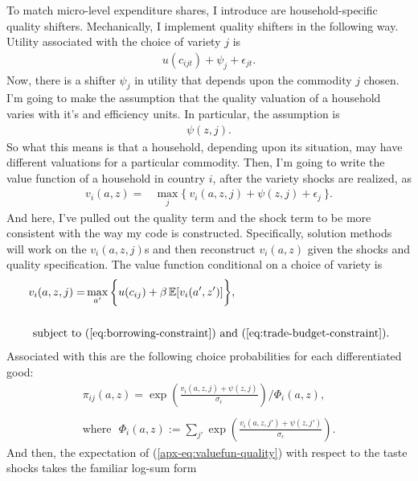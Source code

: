 \documentclass[12pt,pdftex]{article}
\begin{document}
\begin{onehalfspacing}
To match micro-level expenditure shares, I introduce are household-specific quality shifters. Mechanically, I implement quality shifters in the following way. Utility associated with the choice of variety $j$ is
\begin{align}
u(c_{ijt}) + \psi_{j} + \epsilon_{jt}.\label{apx-eq:utility-quality}
\end{align}
Now, there is a shifter $\psi_{j}$ in utility that depends upon the commodity $j$ chosen. I'm going to make the assumption that the quality valuation of a household varies with it's and efficiency units. In particular, the assumption is
\begin{align}
\psi(z, j).
\end{align}
So what this means is that a household, depending upon its situation, may have different valuations for a particular commodity. Then, I'm going to write the value function of a household in country $i$, after the variety shocks are realized, as
\begin{align}
v_{i}(a, z) = &  \max_{j} \big  \{ \  v_{i}(a, z, j) + \psi(z, j) + \epsilon_{j} \ \big \}. \label{apx-eq:valuefun-quality}
\end{align}
And here, I've pulled out the quality term and the shock term to be more consistent with the way my code is constructed. Specifically, solution methods will work on the $v_{i}(a, z, j)$s and then reconstruct $v_{i}(a, z)$ given the shocks and quality specification. The value function conditional on a choice of variety is
\begin{align}
v_{i}(a, z, j) = &  \max_{\ a' \ }\bigg  \{ u(c_{ij}) + \beta \, \mathbb{E} [v_{i}(a', z')]  \bigg\},\\
\nonumber \\
\mbox{subject to}  \ & (\ref{eq:borrowing-constraint}) \  \mathrm{and} \ (\ref{eq:trade-budget-constraint}). \nonumber
\end{align}
Associated with this are the following choice probabilities for each differentiated good:
\begin{align}
\pi_{ij}(a, z) = \exp \left( \frac{ v_{i}(a, z, j) + \psi(z, j) }{\sigma_{\epsilon}} \right) \Bigg / \Phi_{i}(a,z), \\
\nonumber \\
\mbox{where} \ \ \ \Phi_{i}(a,z) := \sum_{j'} \exp \left( \frac{ v_{i}(a, z, j') + \psi(z, j') }{\sigma_{\epsilon}} \right).
\end{align}
And then, the expectation of (\ref{apx-eq:valuefun-quality}) with respect to the taste shocks takes the familiar log-sum form

\end{onehalfspacing}
\end{document}
